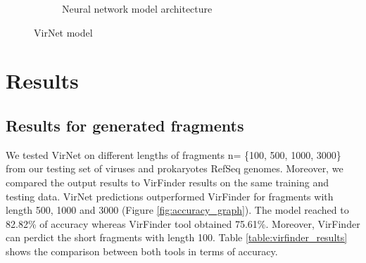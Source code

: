 \documentclass[conference]{IEEEtran}
\begin{document}
\begin{figure}[!htbp]
\begin{subfigure}{0.4\textwidth}
		\caption{Neural network model architecture} 
		\label{fig:model_diagram}
	\end{subfigure}
	\caption{VirNet model} 
	\label{fig:model_arch}
\end{figure}

\section{Results}

\subsection{Results for generated fragments}
We tested VirNet on different lengths of fragments n= \{100, 500, 1000, 3000\} from our testing set of viruses and prokaryotes RefSeq genomes. Moreover, we compared the output results to VirFinder results on the same training and testing data. VirNet predictions outperformed VirFinder for fragments with length 500, 1000 and 3000 (Figure \ref{fig:accuracy_graph}). The model reached to 82.82\% of accuracy whereas VirFinder tool obtained 75.61\%. Moreover, VirFinder can perdict the short fragments with length 100. %
Table \ref{table:virfinder_results} shows the comparison between both tools in terms of accuracy.%

\end{document}
